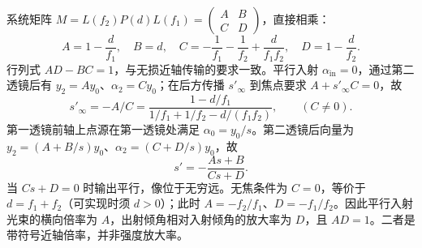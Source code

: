 系统矩阵 \(M=L(f_2)P(d)L(f_1)=\begin{pmatrix}A&B\\C&D\end{pmatrix}\)，直接相乘：
\[A=1-\frac d{f_1},\quad B=d,\quad C=-\frac1{f_1}-\frac1{f_2}+\frac d{f_1f_2},\quad D=1-\frac d{f_2}.\]
行列式 \(AD-BC=1\)，与无损近轴传输的要求一致。平行入射 \(\alpha_\mathrm{in}=0\)，通过第二透镜后有 \(y_2=Ay_0\)、\(\alpha_2=Cy_0\)；在后方传播 \(s'_{\infty}\) 到焦点要求 \(A+s'_{\infty}C=0\)，故
\[s'_{\infty}=-A/C=\frac{1-d/f_1}{1/f_1+1/f_2-d/(f_1f_2)},\qquad(C\ne0).\]
第一透镜前轴上点源在第一透镜处满足 \(\alpha_0=y_0/s\)。第二透镜后向量为 \(y_2=(A+B/s)y_0\)、\(\alpha_2=(C+D/s)y_0\)，故
\[s'=-\frac{As+B}{Cs+D}.\]
当 \(Cs+D=0\) 时输出平行，像位于无穷远。无焦条件为 \(C=0\)，等价于 \(d=f_1+f_2\)（可实现时须 \(d>0\)）；此时 \(A=-f_2/f_1\)、\(D=-f_1/f_2\)。因此平行入射光束的横向倍率为 \(A\)，出射倾角相对入射倾角的放大率为 \(D\)，且 \(AD=1\)。二者是带符号近轴倍率，并非强度放大率。

